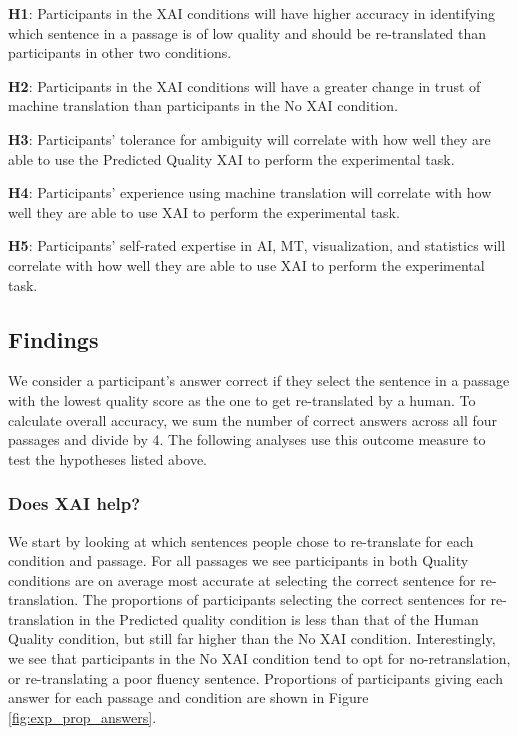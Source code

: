 \begin{compacthang}
    \item \textbf{H1}: Participants in the XAI conditions will have higher accuracy in identifying which sentence in a passage is of low quality and should be re-translated than participants in other two conditions. 
    \item \textbf{H2}: Participants in the XAI conditions will have a greater change in trust of machine translation than participants in the No XAI condition. 
    \item \textbf{H3}: Participants’ tolerance for ambiguity will correlate with how well they are able to use the Predicted Quality XAI to perform the experimental task. 
    \item \textbf{H4}: Participants’ experience using machine translation will correlate with how well they are able to use XAI to perform the experimental task. 
    \item \textbf{H5}: Participants’ self-rated expertise in AI, MT, visualization, and statistics will correlate with how well they are able to use XAI to perform the experimental task.   
\end{compacthang}

\subsection{Findings}

We consider a participant’s answer correct if they select the sentence in a passage with the lowest quality score as the one to get re-translated by a human. To calculate overall accuracy, we sum the number of correct answers across all four passages and divide by 4. The following analyses use this outcome measure to test the hypotheses listed above.

\subsubsection{Does XAI help?}

We start by looking at which sentences people chose to re-translate for each condition and passage. For all  passages we see participants in both Quality conditions are on average most accurate at selecting the correct sentence for re-translation. The proportions of participants selecting the correct sentences for re-translation in the Predicted quality condition is less than that of the Human Quality condition, but still far higher than the No XAI condition. Interestingly, we see that participants in the No XAI condition tend to opt for no-retranslation, or re-translating a poor fluency sentence. Proportions of participants giving each answer for each passage and condition are shown in Figure \ref{fig:exp_prop_answers}.

